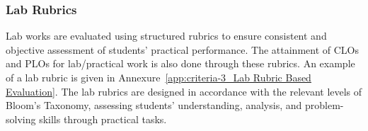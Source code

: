 \hypertarget{sec:labrubrics}{%
\subsubsection{Lab Rubrics}\label{sec:labrubrics}}

Lab works are evaluated using structured rubrics to ensure consistent  and objective assessment of students' practical performance. The attainment of CLOs and PLOs for lab/practical work is also done through these rubrics. An example of a lab rubric is given in Annexure~\ref{app:criteria-3_Lab Rubric Based Evaluation}. The lab rubrics are designed in accordance with the relevant levels of Bloom's Taxonomy, assessing students' understanding, analysis, and problem-solving skills through practical tasks. 


